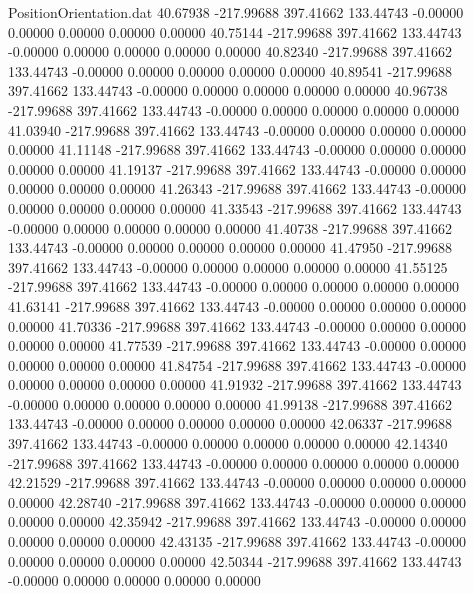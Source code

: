\begin{filecontents}{PositionOrientation.dat}
  40.67938 -217.99688  397.41662   133.44743   -0.00000    0.00000    0.00000    0.00000    0.00000
  40.75144 -217.99688  397.41662   133.44743   -0.00000    0.00000    0.00000    0.00000    0.00000
  40.82340 -217.99688  397.41662   133.44743   -0.00000    0.00000    0.00000    0.00000    0.00000
  40.89541 -217.99688  397.41662   133.44743   -0.00000    0.00000    0.00000    0.00000    0.00000
  40.96738 -217.99688  397.41662   133.44743   -0.00000    0.00000    0.00000    0.00000    0.00000
  41.03940 -217.99688  397.41662   133.44743   -0.00000    0.00000    0.00000    0.00000    0.00000
  41.11148 -217.99688  397.41662   133.44743   -0.00000    0.00000    0.00000    0.00000    0.00000
  41.19137 -217.99688  397.41662   133.44743   -0.00000    0.00000    0.00000    0.00000    0.00000
  41.26343 -217.99688  397.41662   133.44743   -0.00000    0.00000    0.00000    0.00000    0.00000
  41.33543 -217.99688  397.41662   133.44743   -0.00000    0.00000    0.00000    0.00000    0.00000
  41.40738 -217.99688  397.41662   133.44743   -0.00000    0.00000    0.00000    0.00000    0.00000
  41.47950 -217.99688  397.41662   133.44743   -0.00000    0.00000    0.00000    0.00000    0.00000
  41.55125 -217.99688  397.41662   133.44743   -0.00000    0.00000    0.00000    0.00000    0.00000
  41.63141 -217.99688  397.41662   133.44743   -0.00000    0.00000    0.00000    0.00000    0.00000
  41.70336 -217.99688  397.41662   133.44743   -0.00000    0.00000    0.00000    0.00000    0.00000
  41.77539 -217.99688  397.41662   133.44743   -0.00000    0.00000    0.00000    0.00000    0.00000
  41.84754 -217.99688  397.41662   133.44743   -0.00000    0.00000    0.00000    0.00000    0.00000
  41.91932 -217.99688  397.41662   133.44743   -0.00000    0.00000    0.00000    0.00000    0.00000
  41.99138 -217.99688  397.41662   133.44743   -0.00000    0.00000    0.00000    0.00000    0.00000
  42.06337 -217.99688  397.41662   133.44743   -0.00000    0.00000    0.00000    0.00000    0.00000
  42.14340 -217.99688  397.41662   133.44743   -0.00000    0.00000    0.00000    0.00000    0.00000
  42.21529 -217.99688  397.41662   133.44743   -0.00000    0.00000    0.00000    0.00000    0.00000
  42.28740 -217.99688  397.41662   133.44743   -0.00000    0.00000    0.00000    0.00000    0.00000
  42.35942 -217.99688  397.41662   133.44743   -0.00000    0.00000    0.00000    0.00000    0.00000
  42.43135 -217.99688  397.41662   133.44743   -0.00000    0.00000    0.00000    0.00000    0.00000
  42.50344 -217.99688  397.41662   133.44743   -0.00000    0.00000    0.00000    0.00000    0.00000

\end{filecontents}
